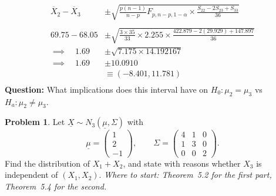 \documentclass[11pt,a4paper]{article}
\theoremstyle{definition}
\newtheorem{problemx}{Problem}[section]
\newenvironment{problem}{\begin{problemx}}{\end{problemx}}
\begin{document}
\begin{enumerate}
\begin{align*}
\overline{X}_2-\overline{X}_3 & \pm \sqrt{\frac{p(n-1)}{n-p}F_{p,n-p,1-\alpha}\times \frac{S_{22}-2S_{23}+S_{33}}{36}}\\\\
69.75 - 68.05 & \pm \sqrt{\frac{3\times 35}{33}\times 2.255\times \frac{422.879-2(29.929)+147.897}{36}}\\
\implies \quad  1.69 & \pm \sqrt{7.175 \times 14.192167}\\
\implies \quad  1.69 & \pm 10.0910\\
& \equiv (-8.401,11.781)\\
\end{align*}
\textbf{Question:} What implications does this interval have on $H_0:\mu_2=\mu_3$ vs $H_a:\mu_2\neq \mu_3$.
\end{enumerate}




























\pagebreak

\newpage

\begin{problem}
Let $\underline{X}\sim N_3(\underline{\mu},\Sigma)$ with
$$\underline{\mu} = \begin{pmatrix}1\\2\\-1\end{pmatrix},
\qquad
\Sigma = \begin{pmatrix} 4 & 1 & 0\\ 1 & 3 & 0\\ 0 & 0 & 2\end{pmatrix}.$$
Find the distribution of $X_1+X_2$, and state with reasons whether $X_3$ is
independent of $(X_1,X_2)$.
\emph{Where to start: Theorem~5.2 for the first part, Theorem~5.4 for the
second.}
\end{problem}
\end{document}
